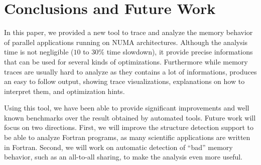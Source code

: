 
\section{Conclusions and Future Work}
\label{sec:concl}


In this paper, we provided a new tool to trace and analyze the memory
behavior of parallel applications running on NUMA architectures. Although the analysis time is not negligible ($10$ to $30\%$ time slowdown), it provide precise informations that can be used for several kinds of
optimizations. Furthermore while memory traces are usually hard to analyze as
they contains a lot of informations, \TABARNAC produces an easy to follow
output, showing trace visualizations, explanations on how to interpret
them, and optimization hints.

Using this tool, we have been able to provide significant improvements and
well known benchmarks over the result obtained by automated tools.
Future work will focus on two directions. First, we will improve the
structure detection support to be able to analyze Fortran programs, as many
scientific applications are written in Fortran. Second, we will work
on automatic detection of ``bad'' memory behavior, such as an all-to-all sharing,
to make the analysis even more useful.

